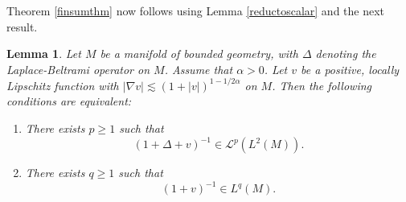 \documentclass[a4paper,reqno]{amsart}
\numberwithin{equation}{section}
\newtheorem{lemma}[thm]{Lemma}
\theoremstyle{definition}
\theoremstyle{remark}
\begin{document}
Theorem \ref{finsumthm} now follows using Lemma \ref{reductoscalar} and the next result.


\begin{lemma}
\label{schattenbounds}
Let $M$ be a manifold of bounded geometry, with $\Delta$ denoting the Laplace-Beltrami operator on $M$. Assume that $\alpha>0$. Let $v$ be a positive, locally Lipschitz function with $|\nabla v|\lesssim (1+|v|)^{1-1/2\alpha}$ on $M$. Then the following conditions are equivalent:
\begin{enumerate}
\item There exists $p\geq 1$ such that
\[(1+\Delta+v)^{-1}\in \mathcal L^p(L^2(M)).\]
\item There exists $q\geq 1$ such that
\[(1+v)^{-1}\in L^q(M). \]
\end{enumerate}
\end{lemma}
\end{document}

